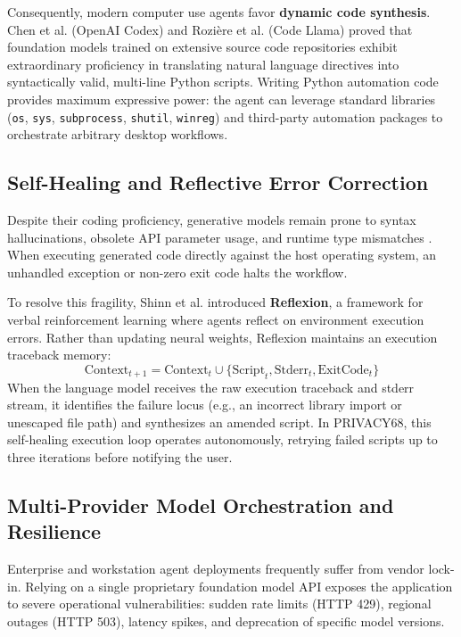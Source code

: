 Consequently, modern computer use agents favor \textbf{dynamic code synthesis}. Chen et al. \cite{chen2021evaluating} (OpenAI Codex) and Rozi{\`e}re et al. \cite{roziere2023code} (Code Llama) proved that foundation models trained on extensive source code repositories exhibit extraordinary proficiency in translating natural language directives into syntactically valid, multi-line Python scripts. Writing Python automation code provides maximum expressive power: the agent can leverage standard libraries (\texttt{os}, \texttt{sys}, \texttt{subprocess}, \texttt{shutil}, \texttt{winreg}) and third-party automation packages to orchestrate arbitrary desktop workflows.

\subsection{Self-Healing and Reflective Error Correction}
Despite their coding proficiency, generative models remain prone to syntax hallucinations, obsolete API parameter usage, and runtime type mismatches \cite{geirhos2020beyond}. When executing generated code directly against the host operating system, an unhandled exception or non-zero exit code halts the workflow.

To resolve this fragility, Shinn et al. \cite{shinn2023reflexion} introduced \textbf{Reflexion}, a framework for verbal reinforcement learning where agents reflect on environment execution errors. Rather than updating neural weights, Reflexion maintains an execution traceback memory:
\begin{equation}
    \text{Context}_{t+1} = \text{Context}_t \cup \{\text{Script}_t, \text{Stderr}_t, \text{ExitCode}_t\}
\end{equation}
When the language model receives the raw execution traceback and stderr stream, it identifies the failure locus (e.g., an incorrect library import or unescaped file path) and synthesizes an amended script. In PRIVACY68, this self-healing execution loop operates autonomously, retrying failed scripts up to three iterations before notifying the user.

\subsection{Multi-Provider Model Orchestration and Resilience}
Enterprise and workstation agent deployments frequently suffer from vendor lock-in. Relying on a single proprietary foundation model API exposes the application to severe operational vulnerabilities: sudden rate limits (HTTP 429), regional outages (HTTP 503), latency spikes, and deprecation of specific model versions.

